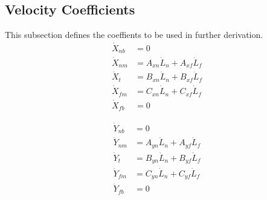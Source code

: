 \documentclass[11pt, landscape]{article}
\begin{document}
\subsection{Velocity Coefficients}
This subsection defines the coeffients to be used in further derivation.\\

\begin{align}
  \dot{X}_{nb} &= 0 \\
  \dot{X}_{nm} &= A_{xn}\dot{L}_n + A_{xf}\dot{L}_f\\
  \dot{X}_{t } &= B_{xn}\dot{L}_n + B_{xf}\dot{L}_f\\
  \dot{X}_{fm} &= C_{xn}\dot{L}_n + C_{xf}\dot{L}_f\\
  \dot{X}_{fb} &= 0
\end{align}  

\begin{align}                                                                          
  \dot{Y}_{nb} &= 0 \\                           
  \dot{Y}_{nm} &= A_{yn}\dot{L}_n + A_{yf}\dot{L}_f\\
  \dot{Y}_{t}  &= B_{yn}\dot{L}_n + B_{yf}\dot{L}_f\\
  \dot{Y}_{fm} &= C_{yn}\dot{L}_n + C_{yf}\dot{L}_f\\
  \dot{Y}_{fb} &= 0 \\
\end{align}
\end{document}
